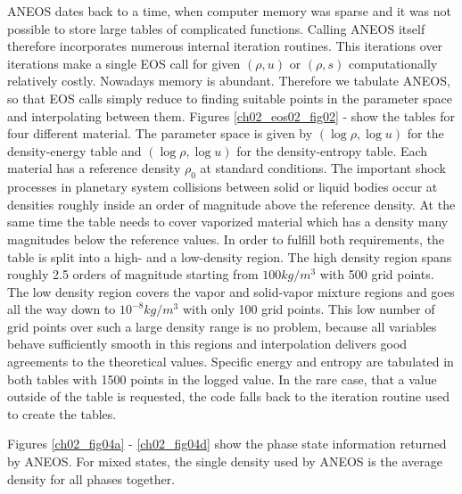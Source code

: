ANEOS dates back to a time, when computer memory was sparse and it was not possible to store large tables of complicated functions. Calling ANEOS itself therefore incorporates numerous internal iteration routines. This iterations over iterations make a single EOS call for given $(\rho, u)$ or $(\rho, s)$ computationally relatively costly. Nowadays memory is abundant. Therefore we tabulate ANEOS, so that EOS calls simply reduce to finding suitable points in the parameter space and interpolating between them. Figures \ref{ch02_eos02_fig02} - \label{ch02_eos02_fig05} show the tables for four different material. The parameter space is given by $(\log \rho, \log u)$ for the density-energy table and $(\log \rho, \log u)$ for the density-entropy table. Each material has a reference density $\rho_0$ at standard conditions. The important shock processes in planetary system collisions between solid or liquid bodies occur at densities roughly inside an order of magnitude above the reference density. At the same time the table needs to cover vaporized material which has a density many magnitudes below the reference values. In order to fulfill both requirements, the table is split into a high- and a low-density region. The high density region spans roughly 2.5 orders of magnitude starting from $100kg/m^3$ with 500 grid points. The low density  region covers the vapor and solid-vapor mixture regions and goes all the way down to $10^{-8}kg/m^3$ with only 100 grid points. This low number of grid points over such a large density range is no problem, because all variables behave sufficiently smooth in this regions and interpolation delivers good agreements to the theoretical values. Specific energy and entropy are tabulated in both tables with 1500 points in the logged value. In the rare case, that a value outside of the table is requested, the code falls back to the iteration routine used to create the tables. 

Figures \ref{ch02_fig04a} - \ref{ch02_fig04d} show the phase state information returned by ANEOS. For mixed states, the single density used by ANEOS is the average density for all phases together.

